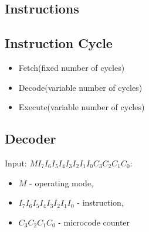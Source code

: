 \documentclass[a4paper]{article}
\begin{document}
\subsection{Instructions}

\subsection{Instruction Cycle}
\begin{itemize}
    \item Fetch(fixed number of cycles)
    \item Decode(variable number of cycles)
    \item Execute(variable number of cycles)
\end{itemize}

\subsection{Decoder}
Input: \texttt{$MI_7I_6I_5I_4I_3I_2I_1I_0C_3C_2C_1C_0$}:
\begin{itemize}
    \item \texttt{$M$} - operating mode, 
    \item \texttt{$I_7I_6I_5I_4I_3I_2I_1I_0$} - instruction, 
    \item \texttt{$C_3C_2C_1C_0$} - microcode counter
\end{itemize}

\pagebreak

%
\end{document}

